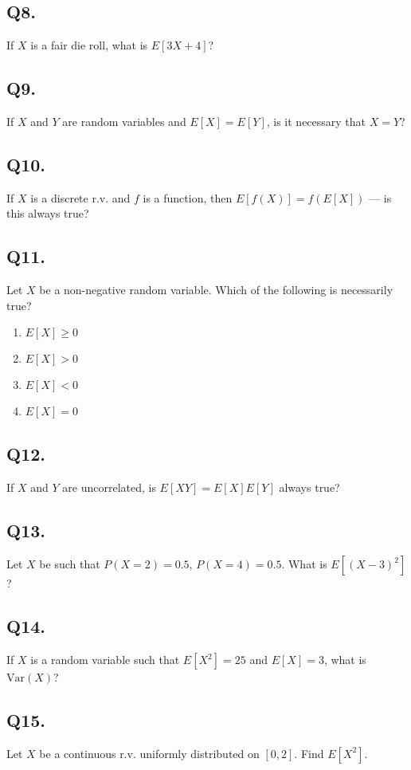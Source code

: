 \subsection*{Q8.}
If $X$ is a fair die roll, what is $E[3X + 4]$?

\subsection*{Q9.}
If $X$ and $Y$ are random variables and $E[X] = E[Y]$, is it necessary that $X = Y$?

\subsection*{Q10.}
If $X$ is a discrete r.v. and $f$ is a function, then $E[f(X)] = f(E[X])$ — is this always true?

\subsection*{Q11.}
Let $X$ be a non-negative random variable. Which of the following is necessarily true?
\begin{enumerate}[label=(\alph*)]
    \item $E[X] \geq 0$
    \item $E[X] > 0$
    \item $E[X] < 0$
    \item $E[X] = 0$
\end{enumerate}

\subsection*{Q12.}
If $X$ and $Y$ are uncorrelated, is $E[XY] = E[X]E[Y]$ always true?

\subsection*{Q13.}
Let $X$ be such that $P(X = 2) = 0.5$, $P(X = 4) = 0.5$. What is $E[(X - 3)^2]$?

\subsection*{Q14.}
If $X$ is a random variable such that $E[X^2] = 25$ and $E[X] = 3$, what is $\text{Var}(X)$?

\subsection*{Q15.}
Let $X$ be a continuous r.v. uniformly distributed on $[0, 2]$. Find $E[X^2]$.


